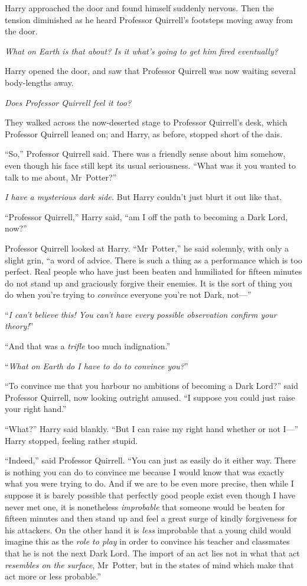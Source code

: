 Harry approached the door and found himself suddenly nervous. Then the tension diminished as he heard Professor Quirrell’s footsteps moving away from the door.

\emph{What on Earth is that about? Is it what’s going to get him fired eventually?}

Harry opened the door, and saw that Professor Quirrell was now waiting several body-lengths away.

\emph{Does Professor Quirrell feel it too?}

They walked across the now-deserted stage to Professor Quirrell’s desk, which Professor Quirrell leaned on; and Harry, as before, stopped short of the dais.

“So,” Professor Quirrell said. There was a friendly sense about him somehow, even though his face still kept its usual seriousness.
“What was it you wanted to talk to me about, Mr~Potter?”

\emph{I have a mysterious dark side.} But Harry couldn’t just blurt it out like that.

“Professor Quirrell,” Harry said, “am I off the path to becoming a Dark Lord, now?”

Professor Quirrell looked at Harry.
“Mr~Potter,” he said solemnly, with only a slight grin, “a word of advice. There is such a thing as a performance which is too perfect. Real people who have just been beaten and humiliated for fifteen minutes do not stand up and graciously forgive their enemies. It is the sort of thing you do when you’re trying to \emph{convince} everyone you’re not Dark, not—”

“\emph{I can’t believe this! You can’t have every possible observation confirm your theory!}”

“And that was a \emph{trifle} too much indignation.”

“\emph{What on Earth do I have to do to convince you?}”

“To convince me that you harbour no ambitions of becoming a Dark Lord?” said Professor Quirrell, now looking outright amused.
“I suppose you could just raise your right hand.”

“What?” Harry said blankly.
“But I can raise my right hand whether or not I—” Harry stopped, feeling rather stupid.

“Indeed,” said Professor Quirrell.
“You can just as easily do it either way. There is nothing you can do to convince me because I would know that was exactly what you were trying to do. And if we are to be even more precise, then while I suppose it is barely possible that perfectly good people exist even though I have never met one, it is nonetheless \emph{improbable} that someone would be beaten for fifteen minutes and then stand up and feel a great surge of kindly forgiveness for his attackers. On the other hand it is \emph{less} improbable that a young child would imagine this as the \emph{role to play} in order to convince his teacher and classmates that he is not the next Dark Lord. The import of an act lies not in what that act \emph{resembles on the surface}, Mr~Potter, but in the states of mind which make that act more or less probable.”

